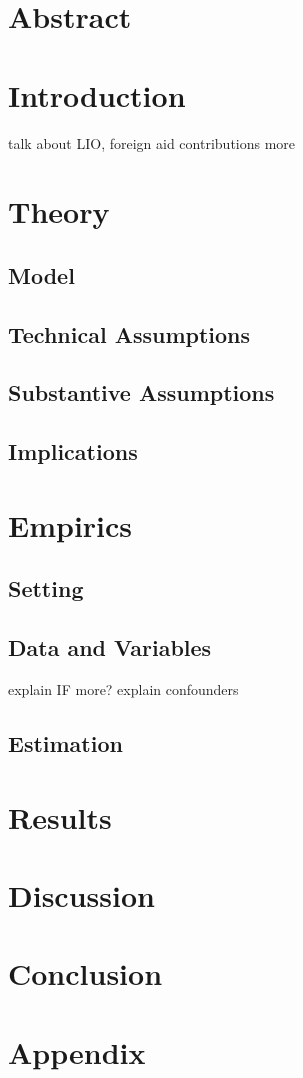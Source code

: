 \section*{Abstract}
\section*{Introduction}
talk about LIO, foreign aid contributions more
\section*{Theory}
\subsection{Model}
\subsection{Technical Assumptions}
\subsection{Substantive Assumptions}
\subsection{Implications}
\section*{Empirics}
\subsection{Setting}
\subsection{Data and Variables}
explain IF more?
explain confounders
\subsection{Estimation}
\section*{Results}
\section*{Discussion}
\section*{Conclusion}
\section*{Appendix}